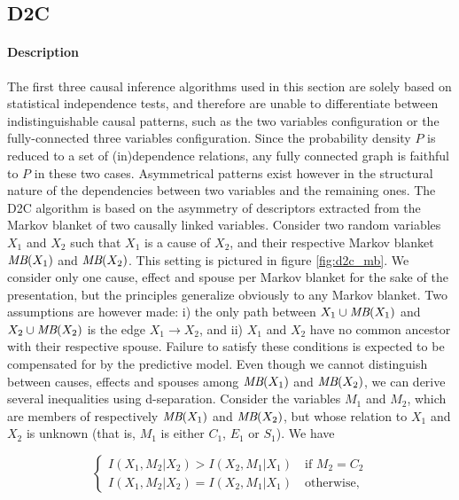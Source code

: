 \subsection{D2C}

\paragraph{Description} The first three causal inference algorithms used in this
section are solely based on statistical independence tests, and therefore are
unable to differentiate between indistinguishable causal patterns, such as the
two variables configuration or the fully-connected three variables
configuration. Since the probability density $P$ is reduced to a set of
(in)dependence relations, any fully connected graph is faithful to $P$ in these
two cases. Asymmetrical patterns exist however in the structural nature of the
dependencies between two variables and the remaining ones. The D2C algorithm
\parencite{bontempi2015dependency} is based on the asymmetry of descriptors
extracted from the Markov blanket of two causally linked variables. Consider two
random variables $X_1$ and $X_2$ such that $X_1$ is a cause of $X_2$, and their
respective Markov blanket $\textit{MB}(X_1)$ and $\textit{MB}(X_2)$. This setting is pictured in
figure \ref{fig:d2c_mb}. We consider only one cause, effect and spouse per
Markov blanket for the sake of the presentation, but the principles generalize
obviously to any Markov blanket. Two assumptions are however made: i) the only
path between $X_1\cup\textit{MB}(X_1)$ and $X_2\cup\textit{MB}(X_2)$ is the edge $X_1\rightarrow
X_2$, and ii) $X_1$ and $X_2$ have no common ancestor with their respective
spouse. Failure to satisfy these conditions is expected to be compensated for by
the predictive model. Even though we cannot distinguish between causes, effects
and spouses among $\textit{MB}(X_1)$ and $\textit{MB}(X_2)$, we can derive several inequalities
using d-separation. Consider the variables $M_1$ and $M_2$, which are members of
respectively  $\textit{MB}(X_1)$ and $\textit{MB}(X_2)$, but whose relation to $X_1$ and $X_2$
is unknown (that is, $M_1$ is either $C_1$, $E_1$ or $S_1$). We have

\begin{equation}
\label{eq:d2c_ineq}
\begin{cases}
    I(X_1, M_2 | X_2) > I(X_2, M_1 | X_1)\quad\text{if }M_2 = C_2 \\
    I(X_1, M_2 | X_2) = I(X_2, M_1 | X_1)\quad\text{otherwise,}
\end{cases}
\end{equation}

